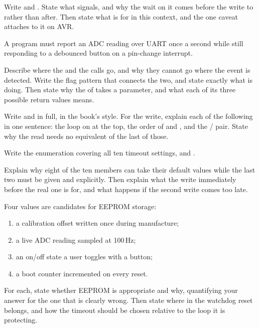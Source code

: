  Write  and . State what 
signals, and why the wait on it comes before the write to  rather than after. Then state
what  is for in this context, and the one caveat  attaches to it on
AVR. 

 A program must report an ADC reading over UART once a second while still responding to a
debounced button on a pin-change interrupt.

Describe where the  and the  calls go, and why they cannot go
where the event is detected. Write the flag pattern that connects the two, and state exactly what
 is doing. Then state why the  of  takes a
 parameter, and what each of its three possible return values means. 

\label{exb:q:6}

 Write \newline and
 in full, in the book's style. For the write, explain each of
the following in one sentence: the loop on  at the top, the order of  and
, and the / pair. State why the read needs no equivalent of the
last of those. 

 Write the enumeration  covering all ten timeout settings, and
.

Explain why eight of the ten members can take their default values while the last two must be given
 and  explicitly. Then explain what the  write immediately before the
real one is for, and what happens if the second write comes too late. 

 Four values are candidates for EEPROM storage:
\begin{enumerate}
  \item a calibration offset written once during manufacture;
  \item a live ADC reading sampled at 100\,Hz;
  \item an on/off state a user toggles with a button;
  \item a boot counter incremented on every reset.
\end{enumerate}
For each, state whether EEPROM is appropriate and why, quantifying your answer for the one that is
clearly wrong. Then state where in  the watchdog reset belongs, and how the timeout
should be chosen relative to the loop it is protecting. 

